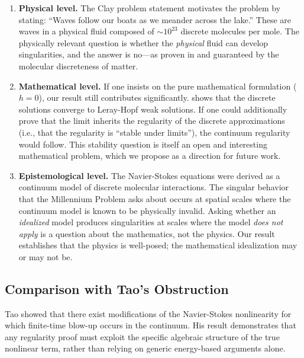 \documentclass[12pt, a4paper]{article}
\theoremstyle{plain}
\theoremstyle{definition}
\begin{document}
\begin{enumerate}[label=(\alph*)]
  \item \textbf{Physical level.} The Clay problem statement
    \citep{Fefferman2006} motivates the problem by stating: ``Waves follow
    our boats as we meander across the lake.'' These are waves in a physical
    fluid composed of $\sim 10^{23}$ discrete molecules per mole. The
    physically relevant question is whether the \emph{physical} fluid can
    develop singularities, and the answer is no---as proven in 
    and guaranteed by the molecular discreteness of matter.

  \item \textbf{Mathematical level.} If one insists on the pure
    mathematical formulation ($h = 0$), our result still contributes
    significantly.  shows that the discrete solutions
    converge to Leray-Hopf weak solutions. If one could additionally prove
    that the limit inherits the regularity of the discrete approximations
    (i.e., that the regularity is ``stable under limits''), the continuum
    regularity would follow. This stability question is itself an open and
    interesting mathematical problem, which we propose as a direction for
    future work.

  \item \textbf{Epistemological level.} The Navier-Stokes equations were
    derived \citep{Navier1822, Stokes1845} as a continuum model of discrete
    molecular interactions. The singular behavior that the Millennium Problem
    asks about occurs at spatial scales where the continuum model is known
    to be physically invalid. Asking whether an \emph{idealized} model
    produces singularities at scales where the model \emph{does not apply}
    is a question about the mathematics, not the physics. Our result
    establishes that the physics is well-posed; the mathematical
    idealization may or may not be.
\end{enumerate}

\subsection{Comparison with Tao's Obstruction}

Tao \citep{Tao2016} showed that there exist modifications of the Navier-Stokes
nonlinearity for which finite-time blow-up occurs in the continuum. His result
demonstrates that any regularity proof must exploit the specific algebraic
structure of the true nonlinear term, rather than relying on generic
energy-based arguments alone.
\end{document}
